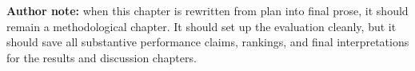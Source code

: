 \noindent\textbf{Author note:}
when this chapter is rewritten from plan into final prose, it should remain a methodological chapter. It should set up the evaluation cleanly, but it should save all substantive performance claims, rankings, and final interpretations for the results and discussion chapters.
